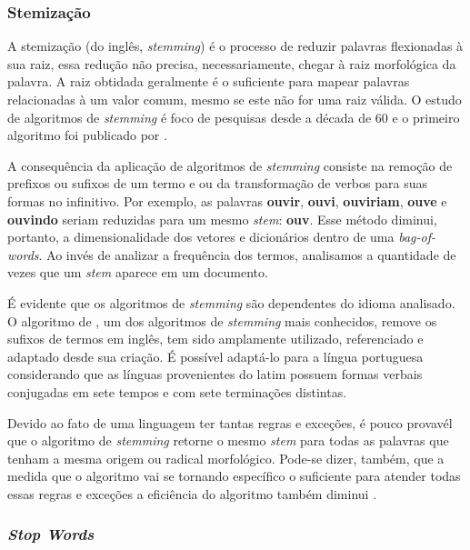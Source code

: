\subsubsection{Stemização}
\label{ssub:stemização}

A stemização (do inglês, \textit{stemming}) é o processo de reduzir palavras flexionadas à sua raiz, essa redução não precisa, necessariamente, chegar à raiz morfológica da palavra. A raiz obtidada geralmente é o suficiente para mapear palavras relacionadas à um valor comum, mesmo se este não for uma raiz válida. O estudo de algoritmos de \textit{stemming} é foco de pesquisas desde a década de 60 e o primeiro algoritmo foi publicado por .

A consequência da aplicação de algoritmos de \textit{stemming} consiste na remoção de prefixos ou sufixos de um termo e ou da transformação de verbos para suas formas no infinitivo. Por exemplo, as palavras \textbf{ouvir}, \textbf{ouvi}, \textbf{ouviriam}, \textbf{ouve} e \textbf{ouvindo} seriam reduzidas para um mesmo \textit{stem}: \textbf{ouv}. Esse método diminui, portanto, a dimensionalidade dos vetores e dicionários dentro de uma \textit{bag-of-words}. Ao invés de analizar a frequência dos termos, analisamos a quantidade de vezes que um \textit{stem} aparece em um documento.

É evidente que os algoritmos de \textit{stemming} são dependentes do idioma analisado. O algoritmo de , um dos algoritmos de \textit{stemming} mais conhecidos, remove os sufixos de termos em inglês, tem sido amplamente utilizado, referenciado e adaptado desde sua criação. É possível adaptá-lo para a língua portuguesa considerando que as línguas provenientes do latim possuem formas verbais conjugadas em sete tempos e com sete terminações distintas.

Devido ao fato de uma linguagem ter tantas regras e exceções, é pouco provavél que o algoritmo de \textit{stemming} retorne o mesmo \textit{stem} para todas as palavras que tenham a mesma origem ou radical morfológico. Pode-se dizer, também, que a medida que o algoritmo vai se tornando específico o suficiente para atender todas essas regras e exceções a eficiência do algoritmo também diminui \cite{imamura2001}.

\subsubsection{\textit{Stop Words}}
\label{ssub:stop_words}

